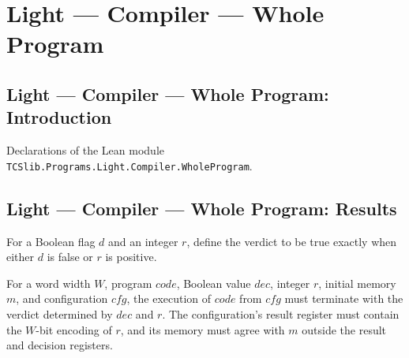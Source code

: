 \section{Light --- Compiler --- Whole Program}
\subsection*{Light --- Compiler --- Whole Program: Introduction}

Declarations of the Lean module \texttt{TCSlib.Programs.Light.Compiler.WholeProgram}.

\subsection*{Light --- Compiler --- Whole Program: Results}

\begin{definition}
\label{Light.verdictOf}
\leanok
For a Boolean flag $d$ and an integer $r$, define the verdict to be true exactly when
either $d$ is false or $r$ is positive.
\end{definition}

\begin{definition}
\label{Light.Compiler.Verdict}
\leanok
{}
For a word width $W$, program $code$, Boolean value $dec$, integer $r$, initial memory
$m$, and configuration $cfg$, the execution of $code$ from $cfg$ must terminate with the
verdict determined by $dec$ and $r$. The configuration’s result register must contain
the $W$-bit encoding of $r$, and its memory must agree with $m$ outside the result and
decision registers.
\end{definition}

